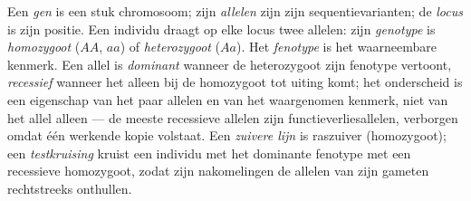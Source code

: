 \begin{definition}\label{def:b2:meiosis-heredity:vocabulary}
Een \emph{gen} is een stuk chromosoom; zijn \emph{allelen} zijn zijn
sequentievarianten; de \emph{locus} is zijn positie. Een 
individu draagt op elke locus twee allelen: zijn \emph{genotype}
is \emph{homozygoot} ($AA$, $aa$) of \emph{heterozygoot} ($Aa$).
Het \emph{fenotype} is het waarneembare kenmerk. Een allel is
\emph{dominant} wanneer de heterozygoot zijn fenotype vertoont,
\emph{recessief} wanneer het alleen bij de homozygoot tot uiting komt;
het onderscheid is een eigenschap van het paar allelen en van het
waargenomen kenmerk, niet van het allel alleen --- de meeste recessieve
allelen zijn functieverliesallelen, verborgen omdat één werkende kopie
volstaat. Een \emph{zuivere lijn} is raszuiver (homozygoot); een
\emph{testkruising} kruist een individu met het dominante fenotype met
een recessieve homozygoot, zodat zijn nakomelingen de allelen van zijn
gameten rechtstreeks onthullen.
\end{definition}

